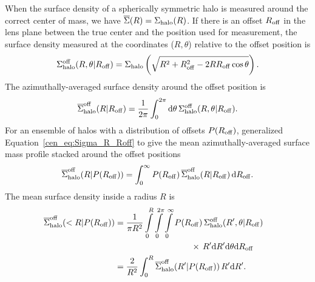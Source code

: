 When the surface density of a spherically symmetric halo is measured
around the correct center of mass, we have
$\overline{\Sigma}(R)=\Sigma_{\rm halo}(R)$. If there is an offset
$R_{\rm off}$ in the lens plane between the true center and the
position used for measurement, the surface density measured at the
coordinates ($R, \theta$) relative to the offset position is
\citep[][Appendix B]{Yang2003}
\begin{equation}
\Sigma_{\rm halo}^{\rm off}(R,\theta|R_{\rm off})=\Sigma_{\rm halo}\left(\sqrt{R^2+R_{\rm off}^2-2RR_{\rm off}\cos\theta}\right).
\end{equation}
The azimuthally-averaged surface density around the offset position is
\begin{equation}
\overline{\Sigma}_{\rm halo}^{\rm off}(R|R_{\rm off})=\frac{1}{2\pi} \int_0^{2\pi}\mathrm{d}\theta\,
\Sigma_{\rm halo}^{\rm off}(R,\theta|R_{\rm off}).
\label{cen_eq:Sigma_R_Roff}
\end{equation}
For an ensemble of halos with a distribution of offsets 
$P(R_{\rm off})$, \citet{Johnston2007a, Johnston2007b} generalized
Equation~\eqref{cen_eq:Sigma_R_Roff} to give the mean azimuthally-averaged
surface mass profile stacked around the offset positions
\begin{equation}
\overline{\Sigma}_{\rm halo}^{\rm off}(R|P(R_{\rm off}))=\int_0^{\infty} 
P(R_{\rm off})\,\overline{\Sigma}_{\rm halo}^{\rm off}(R|R_{\rm
  off})\,\mathrm{d}R_{\rm off}.
\end{equation}
The mean surface density inside a radius $R$ is
\begin{align}
\overline{\Sigma}_{\rm halo}^{\rm off}(<R|P(R_{\rm off})) &=
\frac{1}{\pi R^2}
\int\limits_0^R\int\limits_0^{2\pi}\int\limits_0^{\infty} P(R_{\rm off})\,\Sigma_{\rm halo}^{\rm off}(R',\theta|R_{\rm off})\nonumber\\
& \qquad \qquad \qquad \qquad \quad \times \,R'\mathrm{d}R'\mathrm{d}\theta\mathrm{d}R_{\rm off} \nonumber\\
&= \frac{2}{R^2} \int_0^R \overline{\Sigma}_{\rm halo}^{\rm off}(R'|P(R_{\rm off}))\,R'\mathrm{d}R'.&
\end{align}

